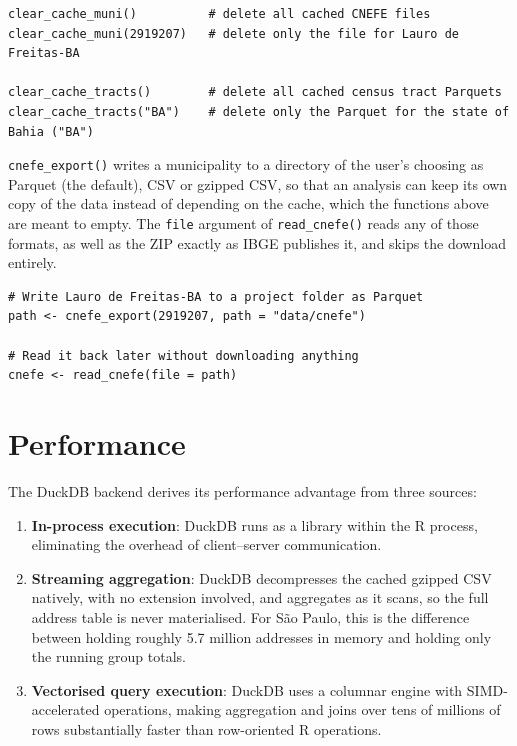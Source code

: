 \begin{verbatim}
clear_cache_muni()          # delete all cached CNEFE files
clear_cache_muni(2919207)   # delete only the file for Lauro de Freitas-BA

clear_cache_tracts()        # delete all cached census tract Parquets
clear_cache_tracts("BA")    # delete only the Parquet for the state of Bahia ("BA")
\end{verbatim}

\texttt{cnefe\_export()} writes a municipality to a directory of the user's
choosing as Parquet (the default), CSV or gzipped CSV, so that an
analysis can keep its own copy of the data instead of depending on the
cache, which the functions above are meant to empty. The \texttt{file}
argument of \texttt{read\_cnefe()} reads any of those formats, as well as the
ZIP exactly as IBGE publishes it, and skips the download entirely.

\begin{verbatim}
# Write Lauro de Freitas-BA to a project folder as Parquet
path <- cnefe_export(2919207, path = "data/cnefe")

# Read it back later without downloading anything
cnefe <- read_cnefe(file = path)
\end{verbatim}

\section{Performance}\label{performance}

The DuckDB backend derives its performance advantage from three sources:

\begin{enumerate}
\def\labelenumi{\arabic{enumi}.}
\tightlist
\item
  \textbf{In-process execution}: DuckDB runs as a library within the R
  process, eliminating the overhead of client--server communication.
\item
  \textbf{Streaming aggregation}: DuckDB decompresses the cached gzipped
  CSV natively, with no extension involved, and aggregates as it
  scans, so the full address table is never materialised. For São
  Paulo, this is the difference between holding roughly 5.7 million
  addresses in memory and holding only the running group totals.
\item
  \textbf{Vectorised query execution}: DuckDB uses a columnar engine with
  SIMD-accelerated operations, making aggregation and joins over tens
  of millions of rows substantially faster than row-oriented R
  operations.
\end{enumerate}

